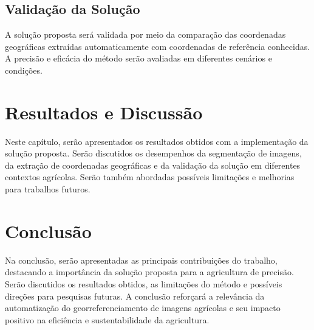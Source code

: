 \documentclass[conference]{IEEEtran}
\begin{document}
\subsection{Validação da Solução}
A solução proposta será validada por meio da comparação das coordenadas geográficas extraídas 
automaticamente com coordenadas de referência conhecidas. A precisão e eficácia do método serão 
avaliadas em diferentes cenários e condições.

\section{Resultados e Discussão}
Neste capítulo, serão apresentados os resultados obtidos com a implementação da solução proposta. 
Serão discutidos os desempenhos da segmentação de imagens, da extração de coordenadas 
geográficas e da validação da solução em diferentes contextos agrícolas. 
Serão também abordadas possíveis limitações e melhorias para trabalhos futuros.

\section{Conclusão}
Na conclusão, serão apresentadas as principais contribuições do trabalho, destacando a 
importância da solução proposta para a agricultura de precisão. Serão discutidos os resultados 
obtidos, as limitações do método e possíveis direções para pesquisas futuras.
A conclusão reforçará a relevância da automatização do georreferenciamento de imagens 
agrícolas e seu impacto positivo na eficiência e sustentabilidade da agricultura.





\end{document}
